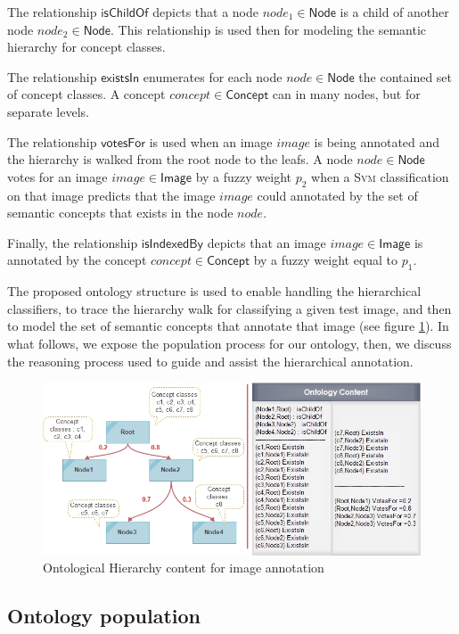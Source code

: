 The relationship $\mathsf{isChildOf}$ depicts that a node $node_{1} \in \mathsf{Node}$ is a child of another node $node_{2} \in \mathsf{Node}$. This relationship is used then for modeling the semantic hierarchy for concept classes.

The relationship $\mathsf{existsIn}$ enumerates for each node $node \in \mathsf{Node}$ the contained set of concept classes. A concept $concept \in \mathsf{Concept}$ can  in many nodes, but for separate levels.
 
The relationship $\mathsf{votesFor}$ is used when an image $image$ is being annotated and the hierarchy is walked from the root node to the leafs. A node $node \in \mathsf{Node}$ votes for an image $image \in \mathsf{Image}$ by a fuzzy weight $p_{2}$ when a \textsc{Svm} classification on that image predicts that the image $image$ could annotated by the set of semantic concepts that exists in the node $node$.
	
Finally, the relationship $\mathsf{isIndexedBy}$ depicts that an image $image \in \mathsf{Image}$ is annotated by the concept $concept \in \mathsf{Concept}$ by a fuzzy weight equal to $p_{1}$.
		
The proposed ontology structure is used to enable handling the hierarchical classifiers, to trace the hierarchy walk for classifying a given test image, and then to model the set of semantic concepts that annotate that image (see figure \ref{fig3}). In what follows, we expose the population process for our ontology, then, we discuss the reasoning process used to guide and assist the hierarchical annotation.


\begin{figure}[ht!]
	\centering
	\includegraphics[scale=0.72]{graphics/contrib3:structure}
	\caption{Ontological Hierarchy content for image annotation}
	\label{fig3}
\end{figure}
		\subsection{Ontology population}
		
